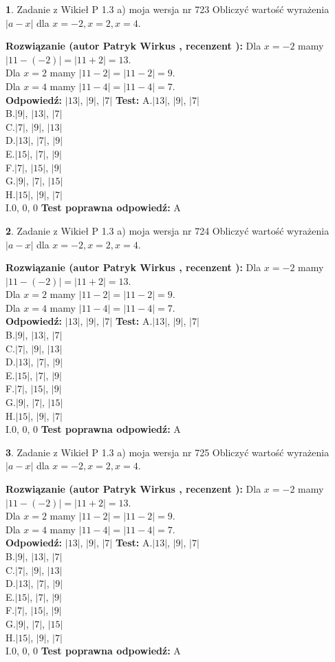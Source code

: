 \documentclass[12pt, a4paper]{article}
\theoremstyle{definition} %
\newtheorem{zad}{}
\newcommand{\zadStart}[1]{\begin{zad}#1\newline}
\newcommand{\zadStop}{\end{zad}}
\newcommand{\rozwStart}[2]{\noindent \textbf{Rozwiązanie (autor #1 , recenzent #2): }\newline}
\newcommand{\rozwStop}{\newline}
\newcommand{\odpStart}{\noindent \textbf{Odpowiedź:}\newline}
\newcommand{\odpStop}{\newline}
\newcommand{\testStart}{\noindent \textbf{Test:}\newline}
\newcommand{\testStop}{\newline}
\newcommand{\kluczStart}{\noindent \textbf{Test poprawna odpowiedź:}\newline}
\newcommand{\kluczStop}{\newline}
\begin{document}
\zadStart{Zadanie z Wikieł P 1.3 a) moja wersja nr 723}
Obliczyć wartość wyrażenia $|a - x|$ dla $x=-2,x=2,x=4$.
\zadStop
\rozwStart{Patryk Wirkus}{}
Dla $x = -2$ mamy $|11 - (-2)| = |11 + 2| = 13$.\\
Dla $x = 2$ mamy $|11 - 2| = |11 - 2| = 9$.\\
Dla $x = 4$ mamy $|11 - 4| = |11 - 4| = 7$.\\
\rozwStop
\odpStart
$|13|$, $|9|$, $|7|$
\odpStop
\testStart
A.$|13|$, $|9|$, $|7|$\\
B.$|9|$, $|13|$, $|7|$\\
C.$|7|$, $|9|$, $|13|$\\
D.$|13|$, $|7|$, $|9|$\\
E.$|15|$, $|7|$, $|9|$\\
F.$|7|$, $|15|$, $|9|$\\
G.$|9|$, $|7|$, $|15|$\\
H.$|15|$, $|9|$, $|7|$\\
I.$0$, $0$, $0$
\testStop
\kluczStart
A
\kluczStop



\zadStart{Zadanie z Wikieł P 1.3 a) moja wersja nr 724}
Obliczyć wartość wyrażenia $|a - x|$ dla $x=-2,x=2,x=4$.
\zadStop
\rozwStart{Patryk Wirkus}{}
Dla $x = -2$ mamy $|11 - (-2)| = |11 + 2| = 13$.\\
Dla $x = 2$ mamy $|11 - 2| = |11 - 2| = 9$.\\
Dla $x = 4$ mamy $|11 - 4| = |11 - 4| = 7$.\\
\rozwStop
\odpStart
$|13|$, $|9|$, $|7|$
\odpStop
\testStart
A.$|13|$, $|9|$, $|7|$\\
B.$|9|$, $|13|$, $|7|$\\
C.$|7|$, $|9|$, $|13|$\\
D.$|13|$, $|7|$, $|9|$\\
E.$|15|$, $|7|$, $|9|$\\
F.$|7|$, $|15|$, $|9|$\\
G.$|9|$, $|7|$, $|15|$\\
H.$|15|$, $|9|$, $|7|$\\
I.$0$, $0$, $0$
\testStop
\kluczStart
A
\kluczStop



\zadStart{Zadanie z Wikieł P 1.3 a) moja wersja nr 725}
Obliczyć wartość wyrażenia $|a - x|$ dla $x=-2,x=2,x=4$.
\zadStop
\rozwStart{Patryk Wirkus}{}
Dla $x = -2$ mamy $|11 - (-2)| = |11 + 2| = 13$.\\
Dla $x = 2$ mamy $|11 - 2| = |11 - 2| = 9$.\\
Dla $x = 4$ mamy $|11 - 4| = |11 - 4| = 7$.\\
\rozwStop
\odpStart
$|13|$, $|9|$, $|7|$
\odpStop
\testStart
A.$|13|$, $|9|$, $|7|$\\
B.$|9|$, $|13|$, $|7|$\\
C.$|7|$, $|9|$, $|13|$\\
D.$|13|$, $|7|$, $|9|$\\
E.$|15|$, $|7|$, $|9|$\\
F.$|7|$, $|15|$, $|9|$\\
G.$|9|$, $|7|$, $|15|$\\
H.$|15|$, $|9|$, $|7|$\\
I.$0$, $0$, $0$
\testStop
\kluczStart
A
\kluczStop
\end{document}

